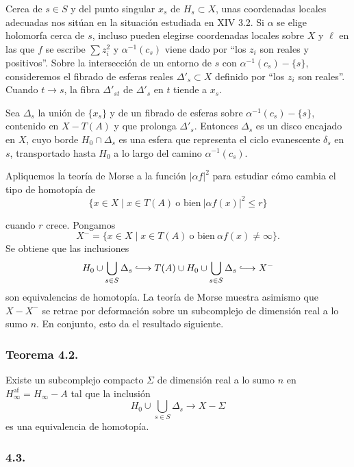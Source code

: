 Cerca de $s\in S$ y del punto singular $x_s$ de $H_s\subset X$, unas
coordenadas locales adecuadas nos sitúan en la situación estudiada en
XIV 3.2. Si $\alpha$ se elige holomorfa cerca de $s$, incluso pueden
elegirse coordenadas locales sobre $X$ y $\ell$ en las que $f$ se
escribe $\sum z_i^2$ y $\alpha^{-1}(c_s)$ viene dado por ``los $z_i$
son reales y positivos''. Sobre la intersección de un entorno de $s$
con $\alpha^{-1}(c_s)-\{s\}$, consideremos el fibrado de esferas reales
$\Delta'_s\subset X$ definido por ``los $z_i$ son reales''. Cuando
$t\to s$, la fibra $\Delta'_{st}$ de $\Delta'_s$ en $t$ tiende a
$x_s$.

Sea $\Delta_s$ la unión de $\{x_s\}$ y de un fibrado de esferas sobre
$\alpha^{-1}(c_s)-\{s\}$, contenido en $X-T(A)$ y que prolonga
$\Delta'_s$. Entonces $\Delta_s$ es un disco encajado en $X$, cuyo
borde $H_0\cap\Delta_s$ es una esfera que representa el ciclo
evanescente $\delta_s$ en $s$, transportado hasta $H_0$ a lo largo del
camino $\alpha^{-1}(c_s)$.

Apliquemos la teoría de Morse a la función $|\alpha f|^2$ para estudiar
cómo cambia el tipo de homotopía de
\[
\{x\in X\mid x\in T(A)\ \text{o bien}\ |\alpha f(x)|^2\leq r\}
\]

\pageoriginale

cuando $r$ crece. Pongamos
\[
X^-=\{x\in X\mid x\in T(A)\ \text{o bien}\ \alpha f(x)\ne\infty\}.
\]
Se obtiene que las inclusiones
\[
H_0\cup\bigcup_{s\in S}\Delta_s
\lhook\joinrel\longrightarrow
T(A)\cup H_0\cup\bigcup_{s\in S}\Delta_s
\lhook\joinrel\longrightarrow X^-
\]
son equivalencias de homotopía. La teoría de Morse muestra asimismo que
$X-X^-$ se retrae por deformación sobre un subcomplejo de dimensión
real a lo sumo $n$. En conjunto, esto da el resultado siguiente.

\subsubsection*{Teorema 4.2.}

Existe un subcomplejo compacto $\Sigma$ de dimensión real a lo sumo
$n$ en $H_\infty^{\mathrm{af}}=H_\infty-A$ tal que la inclusión
\[
H_0\cup\bigcup_{s\in S}\Delta_s\longrightarrow X-\Sigma
\]
es una equivalencia de homotopía.

\subsubsection*{4.3.}

